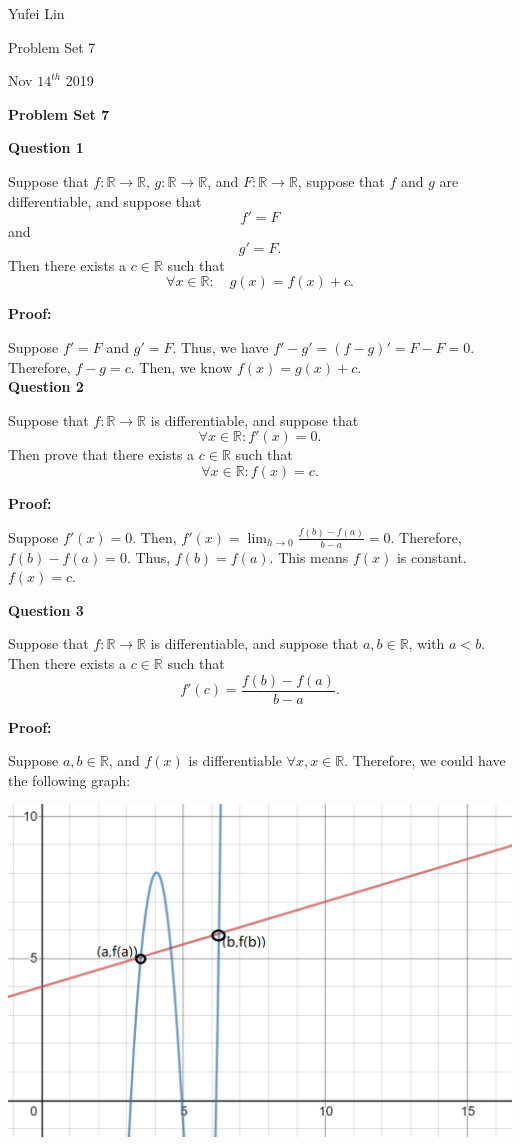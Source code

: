 \documentclass[a4paper,12pt]{report}
\newcommand{\R}{\mathbb{R}}
\begin{document}
\noindent
Yufei Lin

\noindent
Problem Set 7

\noindent
Nov \(14^{th}\) 2019

\begin{center}
\textbf{Problem Set 7}
\end{center}

\noindent
\textbf{Question 1}

\noindent
Suppose that $f:\R\to\R$,
$g:\R\to\R$, and $F:\R\to\R$, suppose that $f$
and $g$ are differentiable, and suppose
that
\[
f'=F
\]
and 
\[
g'=F.
\]
Then there exists a $c\in\R$ such that
\[
\forall x\in\R:\quad g(x)=f(x)+c.
\]

\noindent
\textbf{Proof: }

\noindent
Suppose $f'=F$ and $g'=F$. Thus, we have $f'-g'=(f-g)'=F-F=0$. Therefore, $f-g=c$. Then, we know $f(x)=g(x)+c$.\\

\noindent
\textbf{Question 2}

\noindent
Suppose that $f:\R\to\R$ is
differentiable, and suppose that
\[
\forall x\in\R: f'(x)=0.
\]
Then prove that there exists a $c\in\R$ such that
\[
\forall x\in\R: f(x)=c.
\]

\noindent
\textbf{Proof: }

\noindent
Suppose $f'(x)=0$. Then, $f'(x)=\displaystyle{\lim_{h\to 0}}\frac{f(b)-f(a)}{b-a} = 0$. Therefore, $f(b)-f(a)=0$.  Thus, $f(b)=f(a)$. This means $f(x)$ is constant. $f(x)=c$. 

\pagebreak
\noindent
\textbf{Question 3}

\noindent
Suppose that $f:\R\to\R$ is
differentiable, and suppose that $a,b\in\R$, 
with $a<b$. Then there exists a $c\in\R$
such that
\[
f'(c)=\frac{f(b)-f(a)}{b-a}.
\]

\noindent
\textbf{Proof: }

\noindent
Suppose $a,b\in \mathbb{R}$, and $f(x)$ is differentiable $\forall x, x\in \mathbb{R}$. Therefore, we could have the following graph:

\includegraphics{Question3.png}
\end{document}
